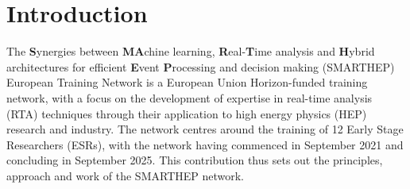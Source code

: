 \section{Introduction}
\label{intro}
The \textbf{S}ynergies between \textbf{MA}chine learning, \textbf{R}eal-\textbf{T}ime analysis and \textbf{H}ybrid architectures for efficient \textbf{E}vent \textbf{P}rocessing and decision making (SMARTHEP) European Training Network is a European Union Horizon-funded training network, with a focus on the development of expertise in real-time analysis (RTA) techniques through their application to high energy physics (HEP) research and industry. The network centres around the training of 12 Early Stage Researchers (ESRs), with the network having commenced in September 2021 and concluding in September 2025. This contribution thus sets out the principles, approach and work of the SMARTHEP network.